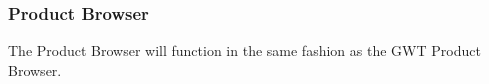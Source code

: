 \subsubsection{Product Browser}

The Product Browser will function in the same fashion as the GWT Product Browser.
